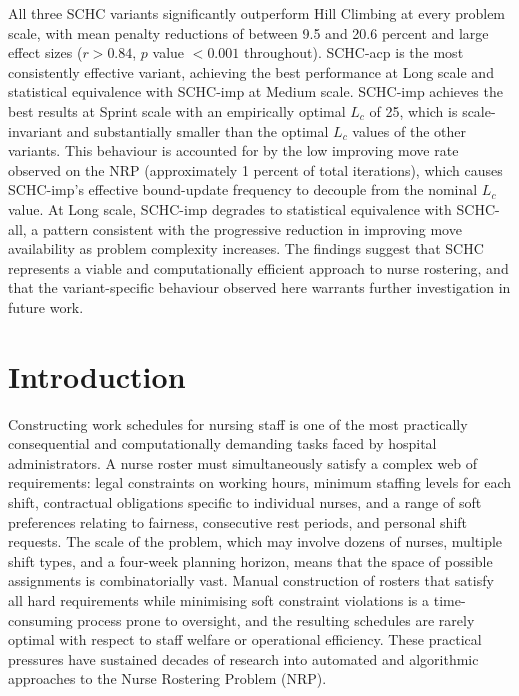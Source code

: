 \documentclass[12pt, a4paper, oneside]{report}
\begin{document}
All three SCHC variants significantly outperform Hill Climbing at
every problem scale, with mean penalty reductions of between 9.5 and
20.6 percent and large effect sizes ($r > 0.84$, $p$ value $< 0.001$
throughout). SCHC-acp is the most consistently effective variant,
achieving the best performance at Long scale and statistical
equivalence with SCHC-imp at Medium scale. SCHC-imp achieves the
best results at Sprint scale with an empirically optimal $L_c$ of 25,
which is scale-invariant and substantially smaller than the optimal
$L_c$ values of the other variants. This behaviour is accounted for
by the low improving move rate observed on the NRP (approximately 1
percent of total iterations), which causes SCHC-imp's effective
bound-update frequency to decouple from the nominal $L_c$ value.
At Long scale, SCHC-imp degrades to statistical equivalence with
SCHC-all, a pattern consistent with the progressive reduction in
improving move availability as problem complexity increases. The
findings suggest that SCHC represents a viable and computationally
efficient approach to nurse rostering, and that the variant-specific
behaviour observed here warrants further investigation in future work.

\newpage

\tableofcontents
\listoftables
\listoffigures
\newpage

\setcounter{page}{1}

\chapter{Introduction}
\label{ch:introduction}

Constructing work schedules for nursing staff is one of the most
practically consequential and computationally demanding tasks faced
by hospital administrators. A nurse roster must simultaneously
satisfy a complex web of requirements: legal constraints on working
hours, minimum staffing levels for each shift, contractual
obligations specific to individual nurses, and a range of soft
preferences relating to fairness, consecutive rest periods, and
personal shift requests. The scale of the problem, which may involve
dozens of nurses, multiple shift types, and a four-week planning
horizon, means that the space of possible assignments is
combinatorially vast. Manual construction of rosters that satisfy
all hard requirements while minimising soft constraint violations is
a time-consuming process prone to oversight, and the resulting
schedules are rarely optimal with respect to staff welfare or
operational efficiency. These practical pressures have sustained
decades of research into automated and algorithmic approaches to the
Nurse Rostering Problem (NRP).
\end{document}
